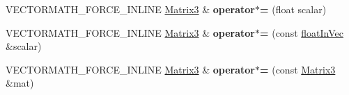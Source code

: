 \begin{DoxyCompactItemize}
\item 
\hypertarget{class_vectormath_1_1_aos_1_1_matrix3_a65e3b2b09e5c1b02a9252cd929583c1e}{V\+E\+C\+T\+O\+R\+M\+A\+T\+H\+\_\+\+F\+O\+R\+C\+E\+\_\+\+I\+N\+L\+I\+N\+E \hyperlink{class_vectormath_1_1_aos_1_1_matrix3}{Matrix3} \& {\bfseries operator$\ast$=} (float scalar)}\label{class_vectormath_1_1_aos_1_1_matrix3_a65e3b2b09e5c1b02a9252cd929583c1e}

\item 
\hypertarget{class_vectormath_1_1_aos_1_1_matrix3_a5c44dba27c620623900342af63f49dd4}{V\+E\+C\+T\+O\+R\+M\+A\+T\+H\+\_\+\+F\+O\+R\+C\+E\+\_\+\+I\+N\+L\+I\+N\+E \hyperlink{class_vectormath_1_1_aos_1_1_matrix3}{Matrix3} \& {\bfseries operator$\ast$=} (const \hyperlink{class_vectormath_1_1float_in_vec}{float\+In\+Vec} \&scalar)}\label{class_vectormath_1_1_aos_1_1_matrix3_a5c44dba27c620623900342af63f49dd4}

\item 
\hypertarget{class_vectormath_1_1_aos_1_1_matrix3_a73b9c8c48d0f0039582e3f806338173e}{V\+E\+C\+T\+O\+R\+M\+A\+T\+H\+\_\+\+F\+O\+R\+C\+E\+\_\+\+I\+N\+L\+I\+N\+E \hyperlink{class_vectormath_1_1_aos_1_1_matrix3}{Matrix3} \& {\bfseries operator$\ast$=} (const \hyperlink{class_vectormath_1_1_aos_1_1_matrix3}{Matrix3} \&mat)}\label{class_vectormath_1_1_aos_1_1_matrix3_a73b9c8c48d0f0039582e3f806338173e}

\end{DoxyCompactItemize}
